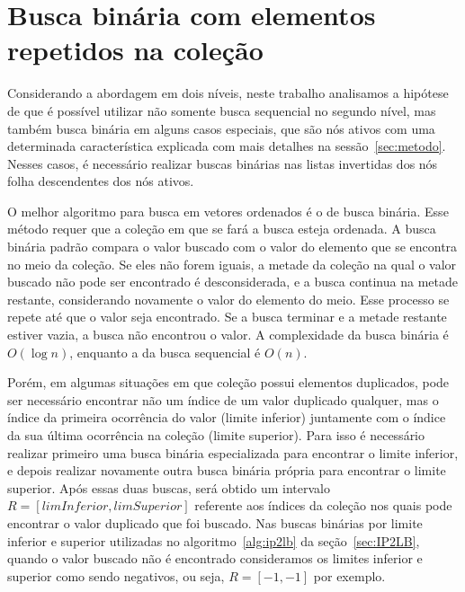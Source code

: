 \section{Busca binária com elementos repetidos na coleção}
\label{sec:binary_search_with_duplicates}

Considerando a abordagem em dois níveis, neste trabalho analisamos a hipótese de que é possível utilizar não somente busca sequencial no segundo nível, mas também busca binária em alguns casos especiais, que são nós ativos com uma determinada característica explicada com mais detalhes na sessão~\ref{sec:metodo}. Nesses casos, é necessário realizar buscas binárias nas listas invertidas dos nós folha descendentes dos nós ativos.

O melhor algoritmo para busca em vetores ordenados é o de busca binária. Esse método requer que a coleção em que se fará a busca esteja ordenada. A busca binária padrão compara o valor buscado com o valor do elemento que se encontra no meio da coleção. Se eles não forem iguais, a metade da coleção na qual o valor buscado não pode ser encontrado é desconsiderada, e a busca continua na metade restante, considerando novamente o valor do elemento do meio. Esse processo se repete até que o valor seja encontrado. Se a busca terminar e a metade restante estiver vazia, a busca não encontrou o valor. A complexidade da busca binária é $O(\log n)$, enquanto a da busca sequencial é $O(n)$.

Porém, em algumas situações em que coleção possui elementos duplicados, pode ser necessário encontrar não um índice de um valor duplicado qualquer, mas o índice da primeira ocorrência do valor (limite inferior) juntamente com o índice da sua última ocorrência na coleção (limite superior). Para isso é necessário realizar primeiro uma busca binária especializada para encontrar o limite inferior, e depois realizar novamente outra busca binária própria para encontrar o limite superior. Após essas duas buscas, será obtido um intervalo $R = [limInferior, limSuperior]$ referente aos índices da coleção nos quais pode encontrar o valor duplicado que foi buscado. Nas buscas binárias por limite inferior e superior utilizadas no algoritmo~\ref{alg:ip2lb} da seção~\ref{sec:IP2LB}, quando o valor buscado não é encontrado consideramos os limites inferior e superior como sendo negativos, ou seja, $R = [-1, -1]$ por exemplo. 

